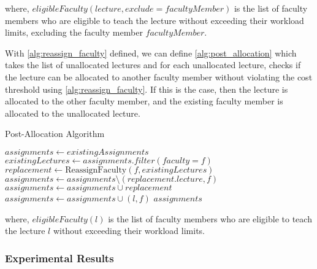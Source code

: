 where, $eligibleFaculty(lecture, exclude=facultyMember)$ is the list of faculty members who are eligible to teach the lecture without exceeding their workload limits, excluding the faculty member $facultyMember$.

With \autoref{alg:reassign_faculty} defined, we can define \autoref{alg:post_allocation} which takes the list of unallocated lectures and for each unallocated lecture, checks if the lecture can be allocated to another faculty member without violating the cost threshold using \autoref{alg:reassign_faculty}. If this is the case, then the lecture is allocated to the other faculty member, and the existing faculty member is allocated to the unallocated lecture.

\begin{algorithm}[H]
  \caption{Post-Allocation Algorithm}
  \begin{algorithmic}[1]
    \State $assignments \gets existingAssignments$
    \State $existingLectures \gets assignments.filter(faculty=f)$
    \State $replacement \gets \text{ReassignFaculty}(f, existingLectures)$
    \State $assignments \gets assignments \setminus (replacement.lecture, f)$
    \State $assignments \gets assignments \cup replacement$
    \State $assignments \gets assignments \cup (l, f)$
    \EndIf
    \EndFor
    \EndFor
    \State \Return $assignments$
    \EndProcedure
  \end{algorithmic}
  \label{alg:post_allocation}
\end{algorithm}

where, $eligibleFaculty(l)$ is the list of faculty members who are eligible to teach the lecture $l$ without exceeding their workload limits.

\subsubsection{Experimental Results}

